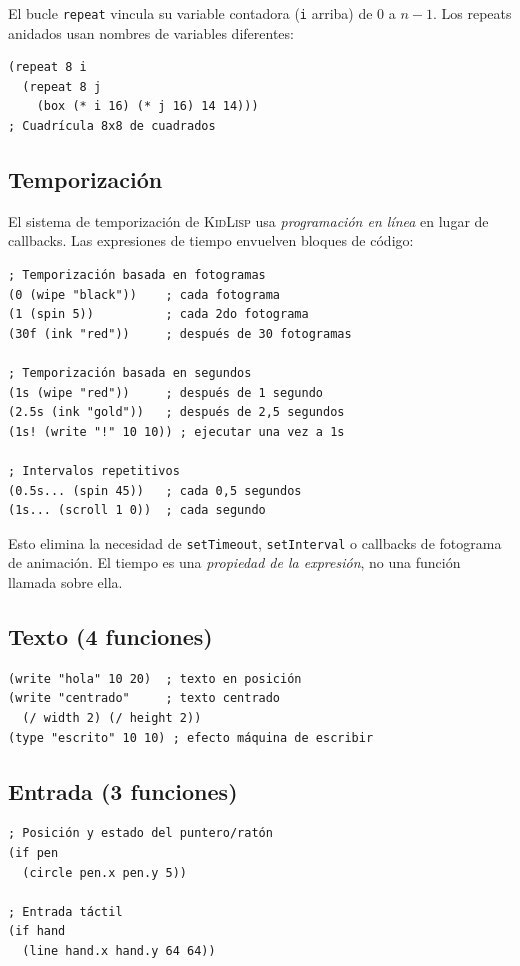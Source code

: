 \documentclass[10pt,letterpaper,twocolumn]{article}
\newcommand{\kl}{\textsc{KidLisp}}
\begin{document}
El bucle \texttt{repeat} vincula su variable contadora (\texttt{i} arriba) de 0 a $n-1$. Los repeats anidados usan nombres de variables diferentes:

\begin{lstlisting}
(repeat 8 i
  (repeat 8 j
    (box (* i 16) (* j 16) 14 14)))
; Cuadrícula 8x8 de cuadrados
\end{lstlisting}

\subsection{Temporización}

El sistema de temporización de \kl{} usa \emph{programación en línea} en lugar de callbacks. Las expresiones de tiempo envuelven bloques de código:

\begin{lstlisting}
; Temporización basada en fotogramas
(0 (wipe "black"))    ; cada fotograma
(1 (spin 5))          ; cada 2do fotograma
(30f (ink "red"))     ; después de 30 fotogramas

; Temporización basada en segundos
(1s (wipe "red"))     ; después de 1 segundo
(2.5s (ink "gold"))   ; después de 2,5 segundos
(1s! (write "!" 10 10)) ; ejecutar una vez a 1s

; Intervalos repetitivos
(0.5s... (spin 45))   ; cada 0,5 segundos
(1s... (scroll 1 0))  ; cada segundo
\end{lstlisting}

Esto elimina la necesidad de \texttt{setTimeout}, \texttt{setInterval} o callbacks de fotograma de animación. El tiempo es una \emph{propiedad de la expresión}, no una función llamada sobre ella.

\subsection{Texto (4 funciones)}

\begin{lstlisting}
(write "hola" 10 20)  ; texto en posición
(write "centrado"     ; texto centrado
  (/ width 2) (/ height 2))
(type "escrito" 10 10) ; efecto máquina de escribir
\end{lstlisting}

\subsection{Entrada (3 funciones)}

\begin{lstlisting}
; Posición y estado del puntero/ratón
(if pen
  (circle pen.x pen.y 5))

; Entrada táctil
(if hand
  (line hand.x hand.y 64 64))
\end{lstlisting}
\end{document}
